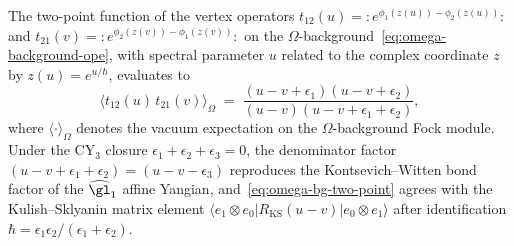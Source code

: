 \begin{theorem}
\label{thm:omega-bg-two-point-match}
The two-point function of the vertex operators
$t_{12}(u) = :e^{\phi_1(z(u)) - \phi_2(z(u))}:$ and
$t_{21}(v) = :e^{\phi_2(z(v)) - \phi_1(z(v))}:$ on the
$\Omega$-background~\eqref{eq:omega-background-ope}, with spectral
parameter $u$ related to the complex coordinate $z$ by
$z(u) = e^{u/\hbar}$, evaluates to
\begin{equation}\label{eq:omega-bg-two-point}
 \langle t_{12}(u)\, t_{21}(v) \rangle_{\Omega}
 \;=\;
 \frac{(u - v + \epsilon_1)(u - v + \epsilon_2)}
 {(u - v)(u - v + \epsilon_1 + \epsilon_2)},
\end{equation}
where $\langle \cdot \rangle_\Omega$ denotes the vacuum expectation
on the $\Omega$-background Fock module. Under the CY$_3$ closure
$\epsilon_1 + \epsilon_2 + \epsilon_3 = 0$, the denominator factor
$(u - v + \epsilon_1 + \epsilon_2) = (u - v - \epsilon_3)$ reproduces
the Kontsevich--Witten bond factor of the $\widehat{\gl}_1$ affine
Yangian, and~\eqref{eq:omega-bg-two-point} agrees with the
Kulish--Sklyanin matrix element
$\langle e_1 \otimes e_0 | R_{\mathrm{KS}}(u - v) | e_0 \otimes e_1 \rangle$
after identification $\hbar = \epsilon_1\epsilon_2/(\epsilon_1 + \epsilon_2)$.
\end{theorem}

